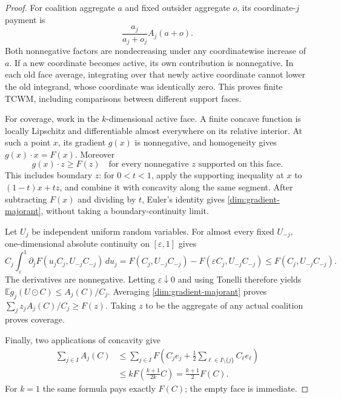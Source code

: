 \documentclass[11pt]{article}
\newcommand{\E}{\mathbb E}
\theoremstyle{definition}\newtheorem{definition}[theorem]{Definition}
\theoremstyle{remark}\newtheorem{remark}[theorem]{Remark}
\begin{document}
\begin{proof}
For coalition aggregate $a$ and fixed outsider aggregate $o$, its
coordinate-$j$ payment is
\[
 \frac{a_j}{a_j+o_j}A_j(a+o).
\]
Both nonnegative factors are nondecreasing under any coordinatewise
increase of $a$. If a new coordinate becomes active, its own contribution
is nonnegative. In each old face average, integrating over that newly
active coordinate cannot lower the old integrand, whose coordinate was
identically zero. This proves finite TCWM, including comparisons between
different support faces.

For coverage, work in the $k$-dimensional active face. A finite concave
function is locally Lipschitz and differentiable almost everywhere on its
relative interior. At such a point $x$, its gradient $g(x)$ is nonnegative,
and homogeneity gives $g(x)\cdot x=F(x)$. Moreover
\begin{equation}\label{dim:gradient-majorant}
 g(x)\cdot z\ge F(z)
 \quad\text{for every nonnegative $z$ supported on this face.}
\end{equation}
This includes boundary $z$: for $0<t<1$, apply the supporting inequality
at $x$ to $(1-t)x+tz$, and combine it with concavity along the same segment.
After subtracting $F(x)$ and dividing by $t$, Euler's identity gives
\eqref{dim:gradient-majorant}, without taking a boundary-continuity limit.

Let $U_j$ be independent uniform random variables. For almost every fixed
$U_{-j}$, one-dimensional absolute continuity on $[\varepsilon,1]$ gives
\[
 C_j\int_\varepsilon^1
 \partial_jF(u_jC_j,U_{-j}C_{-j})\,du_j
 =F(C_j,U_{-j}C_{-j})-F(\varepsilon C_j,U_{-j}C_{-j})
 \le F(C_j,U_{-j}C_{-j}).
\]
The derivatives are nonnegative. Letting $\varepsilon\downarrow0$ and
using Tonelli therefore yields
$\E g_j(U\mathbin{\odot}C)\le A_j(C)/C_j$.
Averaging \eqref{dim:gradient-majorant} proves
$\sum_jz_jA_j(C)/C_j\ge F(z)$. Taking $z$ to be the aggregate of any
actual coalition proves coverage.

Finally, two applications of concavity give
\begin{align*}
 \sum_{j\in I}A_j(C)
 &\le\sum_{j\in I}
 F\left(C_je_j+\tfrac12\sum_{\ell\in I\setminus\{j\}}C_\ell e_\ell\right)\\
 &\le kF\left(\frac{k+1}{2k}C\right)
 =\frac{k+1}{2}F(C).
\end{align*}
For $k=1$ the same formula pays exactly $F(C)$; the empty face is immediate.
\end{proof}
\end{document}
